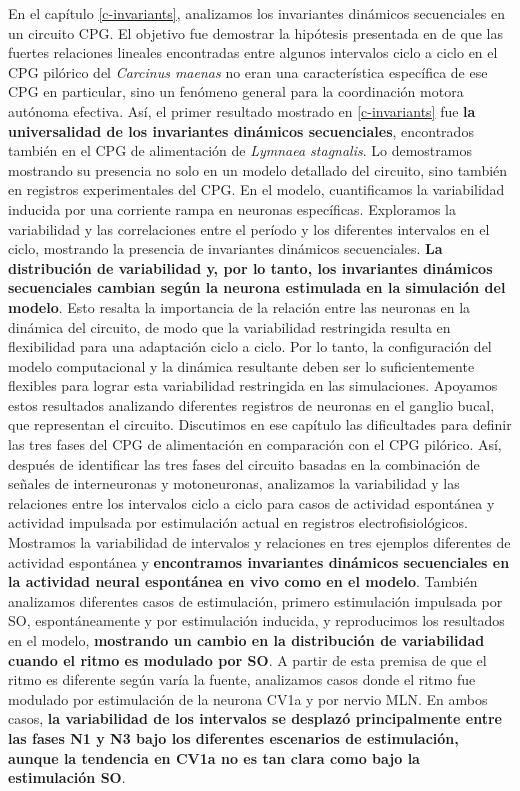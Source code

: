 En el capítulo \ref{c-invariants}, analizamos los invariantes dinámicos secuenciales en un circuito CPG. El objetivo fue demostrar la hipótesis presentada en \cite{elices_robust_2019} de que las fuertes relaciones lineales encontradas entre algunos intervalos ciclo a ciclo en el CPG pilórico del \textit{Carcinus maenas} no eran una característica específica de ese CPG en particular, sino un fenómeno general para la coordinación motora autónoma efectiva. Así, el primer resultado mostrado en \ref{c-invariants} fue \textbf{la universalidad de los invariantes dinámicos secuenciales}, encontrados también en el CPG de alimentación de \textit{Lymnaea stagnalis}. Lo demostramos mostrando su presencia no solo en un modelo detallado del circuito, sino también en registros experimentales del CPG. En el modelo, cuantificamos la variabilidad inducida por una corriente rampa en neuronas específicas. Exploramos la variabilidad y las correlaciones entre el período y los diferentes intervalos en el ciclo, mostrando la presencia de invariantes dinámicos secuenciales. \textbf{La distribución de variabilidad y, por lo tanto, los invariantes dinámicos secuenciales cambian según la neurona estimulada en la simulación del modelo}. Esto resalta la importancia de la relación entre las neuronas en la dinámica del circuito, de modo que la variabilidad restringida resulta en flexibilidad para una adaptación ciclo a ciclo. Por lo tanto, la configuración del modelo computacional y la dinámica resultante deben ser lo suficientemente flexibles para lograr esta variabilidad restringida en las simulaciones. Apoyamos estos resultados analizando diferentes registros de neuronas en el ganglio bucal, que representan el circuito. Discutimos en ese capítulo las dificultades para definir las tres fases del CPG de alimentación en comparación con el CPG pilórico. Así, después de identificar las tres fases del circuito basadas en la combinación de señales de interneuronas y motoneuronas, analizamos la variabilidad y las relaciones entre los intervalos ciclo a ciclo para casos de actividad espontánea y actividad impulsada por estimulación actual en registros electrofisiológicos. Mostramos la variabilidad de intervalos y relaciones en tres ejemplos diferentes de actividad espontánea y \textbf{encontramos invariantes dinámicos secuenciales en la actividad neural espontánea en vivo como en el modelo}. También analizamos diferentes casos de estimulación, primero estimulación impulsada por SO, espontáneamente y por estimulación inducida, y reproducimos los resultados en el modelo, \textbf{mostrando un cambio en la distribución de variabilidad cuando el ritmo es modulado por SO}. A partir de esta premisa de que el ritmo es diferente según varía la fuente, analizamos casos donde el ritmo fue modulado por estimulación de la neurona CV1a y por nervio MLN. En ambos casos, \textbf{la variabilidad de los intervalos se desplazó principalmente entre las fases N1 y N3 bajo los diferentes escenarios de estimulación, aunque la tendencia en CV1a no es tan clara como bajo la estimulación SO}.

